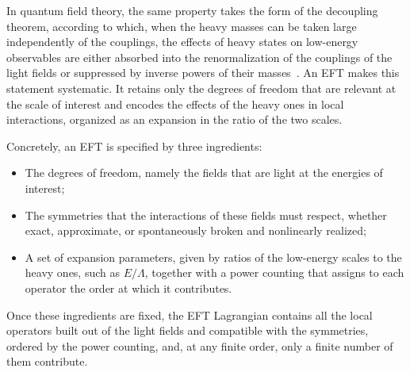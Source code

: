 In quantum field theory, the same property
takes the form of the decoupling theorem, according to which, when the heavy masses can be taken
large independently of the couplings, the effects of heavy states on low-energy observables are
either absorbed into the renormalization of the couplings of the light fields or suppressed by
inverse powers of their masses~\cite{Appelquist:1974tg}. An EFT makes this statement systematic. It
retains only the degrees of freedom that are relevant at the scale of interest and encodes the effects
of the heavy ones in local interactions, organized as an expansion in the ratio of the two scales.

Concretely, an EFT is specified by three ingredients:
\begin{itemize}
    \item The degrees of freedom, namely the fields that are light at the energies of interest;
    \item The symmetries that the interactions of these fields must respect, whether exact,
    approximate, or spontaneously broken and nonlinearly realized;
    \item A set of expansion parameters, given by ratios of the low-energy scales to the heavy ones,
    such as $E/\Lambda$, together with a power counting that assigns to each operator the order at
    which it contributes.
\end{itemize}
Once these ingredients are fixed, the EFT Lagrangian contains all the local operators built out of
the light fields and compatible with the symmetries, ordered by the power counting, and, at any
finite order, only a finite number of them contribute.

